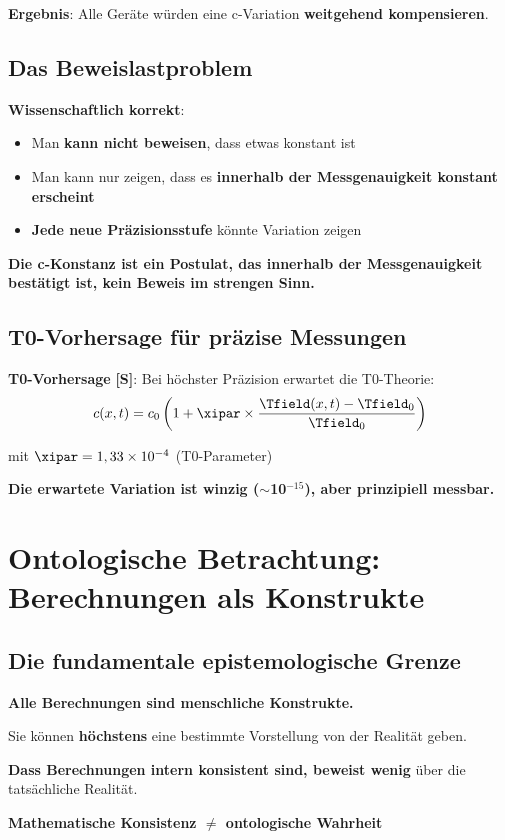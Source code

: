 	\textbf{Ergebnis}: Alle Geräte würden eine c-Variation \textbf{weitgehend kompensieren}.
	
	\subsection{Das Beweislastproblem}
	
	\textbf{Wissenschaftlich korrekt}:
	\begin{itemize}
		\item Man \textbf{kann nicht beweisen}, dass etwas konstant ist
		\item Man kann nur zeigen, dass es \textbf{innerhalb der Messgenauigkeit konstant erscheint}
		\item \textbf{Jede neue Präzisionsstufe} könnte Variation zeigen
	\end{itemize}
	
	\textbf{Die c-Konstanz ist ein Postulat, das innerhalb der Messgenauigkeit bestätigt ist, kein Beweis im strengen Sinn.}
	
	\subsection{T0-Vorhersage für präzise Messungen}
	
	\textbf{T0-Vorhersage} \textbf{[S]}: Bei höchster Präzision erwartet die T0-Theorie:
	\begin{equation}
		c(x,t) = c_0 \left(1 + \xipar \times \frac{\Tfield(x,t) - \Tfield_0}{\Tfield_0}\right)
	\end{equation}
	
	mit $\xipar = 1,33 \times 10^{-4}$ (T0-Parameter)
	
	\textbf{Die erwartete Variation ist winzig ($\sim$10$^{-15}$), aber prinzipiell messbar.}
	
	\section{Ontologische Betrachtung: Berechnungen als Konstrukte}
	
	\subsection{Die fundamentale epistemologische Grenze}
	
	\begin{tcolorbox}[colback=purple!5!white,colframe=purple!75!black,title=Ontologische Grenze]
		\textbf{Alle Berechnungen sind menschliche Konstrukte.}
		
		Sie können \textbf{höchstens} eine bestimmte Vorstellung von der Realität geben.
		
		\textbf{Dass Berechnungen intern konsistent sind, beweist wenig} über die tatsächliche Realität.
		
		\textbf{Mathematische Konsistenz $\neq$ ontologische Wahrheit}
	\end{tcolorbox}
	
